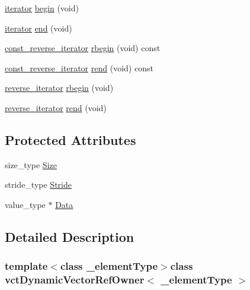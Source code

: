 \begin{DoxyCompactItemize}
\item 
\hyperlink{classvct_dynamic_vector_ref_owner_aaee0b96d24843f333909f2aba3aad782}{iterator} \hyperlink{classvct_dynamic_vector_ref_owner_ad4b80f3d8cfb7143b641fc2f013979c2}{begin} (void)
\item 
\hyperlink{classvct_dynamic_vector_ref_owner_aaee0b96d24843f333909f2aba3aad782}{iterator} \hyperlink{classvct_dynamic_vector_ref_owner_a0bfdd158120e2a16af78d71a2396ea63}{end} (void)
\item 
\hyperlink{classvct_dynamic_vector_ref_owner_a9ab3900ecbd8f4d4eb4615a2c9a972a3}{const\+\_\+reverse\+\_\+iterator} \hyperlink{classvct_dynamic_vector_ref_owner_aaad2fd994d1571470179b8e12672bcaf}{rbegin} (void) const 
\item 
\hyperlink{classvct_dynamic_vector_ref_owner_a9ab3900ecbd8f4d4eb4615a2c9a972a3}{const\+\_\+reverse\+\_\+iterator} \hyperlink{classvct_dynamic_vector_ref_owner_a68b96753d2c8a7ef3cbe51d6e827cbee}{rend} (void) const 
\item 
\hyperlink{classvct_dynamic_vector_ref_owner_a3949acd3baa131459d464b058d249990}{reverse\+\_\+iterator} \hyperlink{classvct_dynamic_vector_ref_owner_ac6aed949da243790178097926f02eae2}{rbegin} (void)
\item 
\hyperlink{classvct_dynamic_vector_ref_owner_a3949acd3baa131459d464b058d249990}{reverse\+\_\+iterator} \hyperlink{classvct_dynamic_vector_ref_owner_ad6b48611d5e7d5ff74cde4f6a521aa91}{rend} (void)
\end{DoxyCompactItemize}
\subsection*{Protected Attributes}
\begin{DoxyCompactItemize}
\item 
size\+\_\+type \hyperlink{classvct_dynamic_vector_ref_owner_ab2a6a1ca285d5c64b4e39f6f33d1794d}{Size}
\item 
stride\+\_\+type \hyperlink{classvct_dynamic_vector_ref_owner_ae346c9cef9e023214e0286791fedae25}{Stride}
\item 
value\+\_\+type $\ast$ \hyperlink{classvct_dynamic_vector_ref_owner_a50664ce25ed6de8628998b3223998515}{Data}
\end{DoxyCompactItemize}


\subsection{Detailed Description}
\subsubsection*{template$<$class \+\_\+element\+Type$>$class vct\+Dynamic\+Vector\+Ref\+Owner$<$ \+\_\+element\+Type $>$}

